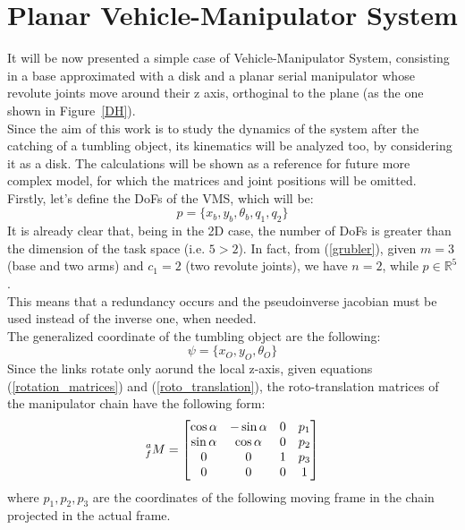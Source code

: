 \documentclass[a4paper,12pt,oneside]{report}
\begin{document}
\section{Planar Vehicle-Manipulator System}\label{planar_VMS}
It will be now presented a simple case of Vehicle-Manipulator System, consisting in a base approximated with a disk and a planar serial manipulator whose revolute joints move around their z axis, orthoginal to the plane (as the one shown in Figure~\ref{DH}).\\
Since the aim of this work is to study the dynamics of the system after the catching of a tumbling object, its kinematics will be analyzed too, by considering it as a disk. The calculations will be shown as a reference for future more complex model, for which the matrices and joint positions will be omitted.\\
Firstly, let's define the DoFs of the VMS, which will be:
\begin{equation}
  p=\{x_b,y_b,\theta_b,q_1,q_2\}
\end{equation}
It is already clear that, being in the 2D case, the number of DoFs is greater than the dimension of the task space (i.e. $5>2$). In fact, from (\ref{grubler}), given $m=3$ (base and two arms) and $c_1=2$ (two revolute joints), we have $n=2$, while $p\in\mathbb{R} ^5$.\\ 
This means that a redundancy occurs and the pseudoinverse jacobian must be used instead of the inverse one, when needed.\\
The generalized coordinate of the tumbling object are the following:
\begin{equation}
  \psi=\{x_O,y_O,\theta_O\}
  \label{object_coordinates}
\end{equation}
Since the links rotate only aorund the local z-axis, given equations (\ref{rotation_matrices}) and (\ref{roto_translation}), the roto-translation matrices of the manipulator chain have the following form:
\begin{equation}
  \prescript{a}{f}{M}=
  \begin{bmatrix}
    \cos{\alpha}&-\sin{\alpha}&0&p_1\\
    \sin{\alpha}&\cos{\alpha}&0&p_2\\
    0&0&1&p_3\\
    0&0&0&1
  \end{bmatrix}
\end{equation}
where $p_1,p_2,p_3$ are the coordinates of the following moving frame in the chain projected in the actual frame.\\
\end{document}
